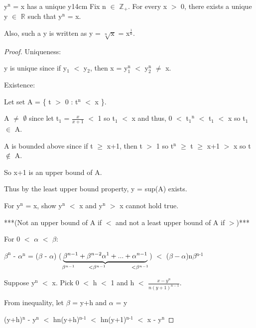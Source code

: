 	\begin{wtheorem}{y$^\text{n}$ = x has a unique y}{14cm}
		Fix n $\in$ $\mathbb{Z}_+$. For every x $>$ 0, there exists a unique y
		$\in$ $ \mathbb{R} $ such that y$^\text{n}$ = x.

		Also, such a y is written as y = $\sqrt[n]{\text{x}}$
		= x$^{\frac{1}{\text{n}}}$.		
	\end{wtheorem}
	
	\begin{proof}
		{ \color{lblue} Uniqueness: }

		y is unique since if y$_{1}$ $<$ y$_{2}$, then
		x = y$_{1}^\text{n}$ $<$ y$_{2}^\text{n}$ $\neq$ x.

		{ \color{lblue} Existence: }

		Let set A = \{ t $>$ 0 : t$^\text{n}$ $<$ x \}.

		A $\not =$ $\emptyset$ since let t$_{1}$ = $\frac{x}{x+1}$ $<$ 1 so t$_1$ $<$ x
		and thus, 0 $<$ t$_{1}$$^\text{n}$ $<$ t$_{1}$ $<$ x so t$_{1}$ $\in$ A.

		A is bounded above since if t $ \geq $ x+1, then
		t $>$ 1 so t$^\text{n}$ $ \geq $ t $ \geq $ x+1 $>$ x so t $\not \in$ A.

		So x+1 is an upper bound of A.

		Thus by the least upper bound property, y = sup(A) exists.

		For y$^\text{n}$ = x, show y$^\text{n}$ $<$ x and
		y$^\text{n}$ $>$ x cannot hold true.

		***(Not an upper bound of A if $<$ and not a least upper bound of A if $>$)***

		For 0 $<$ $\alpha$ $<$ $\beta$:

		\hspace{1cm}
		$\beta ^\text{n}$ - $\alpha^\text{n}$
		= ($\beta$ - $\alpha$) ($\underbrace{\beta^{n-1}
		+ \beta^{n-2}\alpha^1 + ... + \alpha^{n-1}}
		_{\beta^{n-1} \hspace{0.7cm} <\beta^{n-1} \hspace{1.3cm} <\beta^{n-1}}$)
		$<$ ($\beta - \alpha$)n$\beta$$^\text{n-1}$ 

		Suppose y$^\text{n}$ $<$ x. Pick 0 $<$ h $<$ 1 and
		h $<$ $\frac{x-y^n}{n(y+1)^{n-1}}$.

		\hspace{1cm}
		From inequality, let $\beta$ = y+h and $\alpha$ = y

		\hspace{1cm}
		(y+h)$^\text{n}$ - y$^\text{n}$ $<$ hn(y+h)$^\text{n-1}$
		$<$ hn(y+1)$^\text{n-1}$ $<$ x - y$^\text{n}$


\end{proof}
